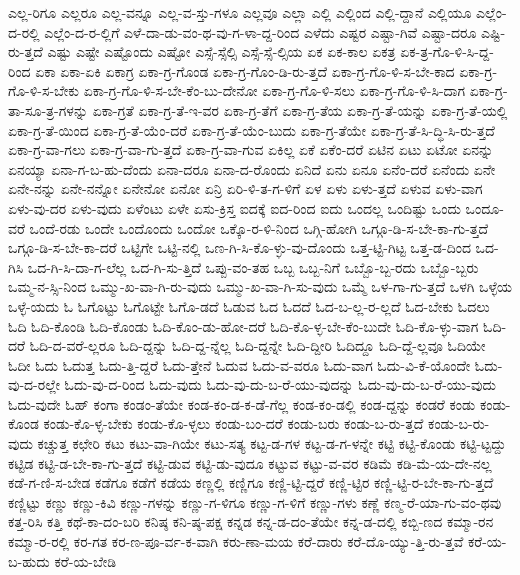 {ಎಲ್ಲ-ರಿಗೂ
ಎಲ್ಲರೂ
ಎಲ್ಲ-ವನ್ನೂ
ಎಲ್ಲ-ವ-ಸ್ತು-ಗಳೂ
ಎಲ್ಲವೂ
ಎಲ್ಲಾ
ಎಲ್ಲಿ
ಎಲ್ಲಿಂದ
ಎಲ್ಲಿ-ದ್ದಾನೆ
ಎಲ್ಲಿಯೂ
ಎಲ್ಲೆಂ-ದ-ರಲ್ಲಿ
ಎಲ್ಲೆಂ-ದ-ರ-ಲ್ಲಿಗೆ
ಎಳೆ-ದಾ-ಡು-ವಂ-ಥ-ವು-ಗ-ಳಾ-ದ್ದ-ರಿಂದ
ಎಳೆದು
ಎಷ್ಟರ
ಎಷ್ಟಾ-ಗಿವೆ
ಎಷ್ಟಾ-ದರೂ
ಎಷ್ಟಿ-ರು-ತ್ತದೆ
ಎಷ್ಟು
ಎಷ್ಟೇ
ಎಷ್ಟೊಂದು
ಎಷ್ಟೋ
ಎಸ್ಸೆ-ಸ್ಸೆಲ್ಸಿ
ಎಸ್ಸೆ-ಸ್ಸೆ-ಲ್ಸಿಯ
ಏಕ
ಏಕ-ಕಾಲ
ಏಕತ್ರ
ಏಕ-ತ್ರ-ಗೊ-ಳಿ-ಸಿ-ದ್ದ-ರಿಂದ
ಏಕಾ
ಏಕಾ-ಏಕಿ
ಏಕಾಗ್ರ
ಏಕಾ-ಗ್ರ-ಗೊಂಡ
ಏಕಾ-ಗ್ರ-ಗೊಂ-ಡಿ-ರು-ತ್ತದೆ
ಏಕಾ-ಗ್ರ-ಗೊ-ಳಿ-ಸ-ಬೇ-ಕಾದ
ಏಕಾ-ಗ್ರ-ಗೊ-ಳಿ-ಸ-ಬೇಕು
ಏಕಾ-ಗ್ರ-ಗೊ-ಳಿ-ಸ-ಬೇ-ಕೆಂ-ಬು-ದೇನೋ
ಏಕಾ-ಗ್ರ-ಗೊ-ಳಿ-ಸಲು
ಏಕಾ-ಗ್ರ-ಗೊ-ಳಿ-ಸಿ-ದಾಗ
ಏಕಾ-ಗ್ರ-ತಾ-ಸೂ-ತ್ರ-ಗಳನ್ನು
ಏಕಾ-ಗ್ರತೆ
ಏಕಾ-ಗ್ರ-ತೆ-ಇ-ವರ
ಏಕಾ-ಗ್ರ-ತೆಗೆ
ಏಕಾ-ಗ್ರ-ತೆಯ
ಏಕಾ-ಗ್ರ-ತೆ-ಯನ್ನು
ಏಕಾ-ಗ್ರ-ತೆ-ಯಲ್ಲಿ
ಏಕಾ-ಗ್ರ-ತೆ-ಯಿಂದ
ಏಕಾ-ಗ್ರ-ತೆ-ಯೆಂ-ದರೆ
ಏಕಾ-ಗ್ರ-ತೆ-ಯೆಂ-ಬುದು
ಏಕಾ-ಗ್ರ-ತೆಯೇ
ಏಕಾ-ಗ್ರ-ತೆ-ಸಿ-ದ್ಧಿ-ಸಿ-ರು-ತ್ತದೆ
ಏಕಾ-ಗ್ರ-ವಾ-ಗಲು
ಏಕಾ-ಗ್ರ-ವಾ-ಗು-ತ್ತದೆ
ಏಕಾ-ಗ್ರ-ವಾ-ಗುವ
ಏಕಿಲ್ಲ
ಏಕೆ
ಏಕೆಂ-ದರೆ
ಏಟಿನ
ಏಟು
ಏಟೋ
ಏನನ್ನು
ಏನಯ್ಯಾ
ಏನಾ-ಗ-ಬ-ಹು-ದೆಂದು
ಏನಾ-ದರೂ
ಏನಾ-ದ-ರೊಂದು
ಏನಿದೆ
ಏನು
ಏನೂ
ಏನೆಂ-ದರೆ
ಏನೆಂದು
ಏನೇ
ಏನೇ-ನನ್ನು
ಏನೇ-ನನ್ನೋ
ಏನೇನೋ
ಏನೋ
ಏನ್ರಿ
ಏರಿ-ಳಿ-ತ-ಗ-ಳಿಗೆ
ಏಳ
ಏಳು
ಏಳು-ತ್ತದೆ
ಏಳುವ
ಏಳು-ವಾಗ
ಏಳು-ವು-ದರ
ಏಳು-ವುದು
ಏಳೆಂಟು
ಏಳೇ
ಏಸು-ಕ್ರಿಸ್ತ
ಐದಕ್ಕೆ
ಐದ-ರಿಂದ
ಐದು
ಒಂದಲ್ಲ
ಒಂದಿಷ್ಟು
ಒಂದು
ಒಂದೂ-ವರೆ
ಒಂದೆ-ರಡು
ಒಂದೇ
ಒಂದೊಂದು
ಒಂದೋ
ಒಕ್ಕೊ-ರ-ಳಿ-ನಿಂದ
ಒಗ್ಗಿ-ಹೋಗಿ
ಒಗ್ಗೂ-ಡಿ-ಸ-ಬೇ-ಕಾ-ಗು-ತ್ತದೆ
ಒಗ್ಗೂ-ಡಿ-ಸ-ಬೇ-ಕಾ-ದರೆ
ಒಟ್ಟಿಗೇ
ಒಟ್ಟಿ-ನಲ್ಲಿ
ಒಣ-ಗಿ-ಸಿ-ಕೊ-ಳ್ಳು-ವು-ದೊಂದು
ಒತ್ತ-ಟ್ಟಿ-ಗಿಟ್ಟ
ಒತ್ತ-ಡ-ದಿಂದ
ಒದ-ಗಿಸಿ
ಒದ-ಗಿ-ಸಿ-ದಾ-ಗ-ಲೆಲ್ಲ
ಒದ-ಗಿ-ಸು-ತ್ತಿದೆ
ಒಪ್ಪು-ವಂ-ತಹ
ಒಬ್ಬ
ಒಬ್ಬ-ನಿಗೆ
ಒಬ್ಬೊ-ಬ್ಬ-ರದು
ಒಬ್ಬೊ-ಬ್ಬರು
ಒಮ್ಮ-ನ-ಸ್ಸಿ-ನಿಂದ
ಒಮ್ಮು-ಖ-ವಾ-ಗಿ-ರು-ವುದು
ಒಮ್ಮು-ಖ-ವಾ-ಗಿ-ಸು-ವುದು
ಒಮ್ಮೆ
ಒಳ-ಗಾ-ಗು-ತ್ತದೆ
ಒಳಗಿ
ಒಳ್ಳೆಯ
ಒಳ್ಳೆ-ಯದು
ಓ
ಓಗೊಟ್ಟು
ಓಗೊಟ್ಟೇ
ಓಗೊ-ಡದೆ
ಓಡುವ
ಓದ
ಓದದೆ
ಓದ-ಬ-ಲ್ಲ-ರ-ಲ್ಲದೆ
ಓದ-ಬೇಕು
ಓದಲು
ಓದಿ
ಓದಿ-ಕೊಂಡಿ
ಓದಿ-ಕೊಂಡು
ಓದಿ-ಕೊಂ-ಡು-ಹೋ-ದರೆ
ಓದಿ-ಕೊ-ಳ್ಳ-ಬೇ-ಕೆಂ-ಬುದೇ
ಓದಿ-ಕೊ-ಳ್ಳು-ವಾಗ
ಓದಿ-ದರೆ
ಓದಿ-ದ-ವರೆ-ಲ್ಲರೂ
ಓದಿ-ದ್ದನ್ನು
ಓದಿ-ದ್ದ-ನ್ನೆಲ್ಲ
ಓದಿ-ದ್ದನ್ನೇ
ಓದಿ-ದ್ದೀರಿ
ಓದಿದ್ದೂ
ಓದಿ-ದ್ದೆ-ಲ್ಲವೂ
ಓದಿಯೇ
ಓದೀ
ಓದು
ಓದುತ್ತ
ಓದು-ತ್ತಿ-ದ್ದರೆ
ಓದು-ತ್ತೇನೆ
ಓದುವ
ಓದು-ವ-ವರೂ
ಓದು-ವಾಗ
ಓದು-ವಿ-ಕೆ-ಯೊಂದೇ
ಓದು-ವು-ದ-ರಲ್ಲೇ
ಓದು-ವು-ದ-ರಿಂದ
ಓದು-ವುದು
ಓದು-ವು-ದು-ಬ-ರೆ-ಯು-ವುದನ್ನು
ಓದು-ವು-ದು-ಬ-ರೆ-ಯು-ವುದು
ಓದು-ವುದೇ
ಓಹ್
ಕಂಗಾ
ಕಂಡಂ-ತೆಯೇ
ಕಂಡ-ಕಂ-ಡ-ಕ-ಡೆ-ಗೆಲ್ಲ
ಕಂಡ-ಕಂ-ಡಲ್ಲಿ
ಕಂಡ-ದ್ದನ್ನು
ಕಂಡರೆ
ಕಂಡು
ಕಂಡು-ಕೊಂಡ
ಕಂಡು-ಕೊ-ಳ್ಳ-ಬೇಕು
ಕಂಡು-ಕೊ-ಳ್ಳಲು
ಕಂಡು-ಬಂ-ದರೆ
ಕಂಡು-ಬರು
ಕಂಡು-ಬ-ರು-ತ್ತದೆ
ಕಂಡು-ಬ-ರು-ವುದು
ಕಚ್ಚುತ್ತ
ಕಛೇರಿ
ಕಟು
ಕಟು-ವಾ-ಗಿಯೇ
ಕಟು-ಸತ್ಯ
ಕಟ್ಟ-ಡ-ಗಳ
ಕಟ್ಟ-ಡ-ಗ-ಳನ್ನೇ
ಕಟ್ಟಿ
ಕಟ್ಟಿ-ಕೊಂಡು
ಕಟ್ಟಿ-ಟ್ಟದ್ದು
ಕಟ್ಟಿಡ
ಕಟ್ಟಿ-ಡ-ಬೇ-ಕಾ-ಗು-ತ್ತದೆ
ಕಟ್ಟಿ-ಡುವ
ಕಟ್ಟಿ-ಡು-ವುದೂ
ಕಟ್ಟುವ
ಕಟ್ಟು-ವ-ವರ
ಕಡಿಮೆ
ಕಡಿ-ಮೆ-ಯ-ದೇ-ನಲ್ಲ
ಕಡೆ-ಗ-ಣಿ-ಸ-ಬೇಡ
ಕಡೆಗೂ
ಕಡೆಗೆ
ಕಡೆಯ
ಕಣ್ಣಲ್ಲಿ
ಕಣ್ಣಿಗೂ
ಕಣ್ಣಿ-ಟ್ಟಿ-ದ್ದರೆ
ಕಣ್ಣಿ-ಟ್ಟಿರ
ಕಣ್ಣಿ-ಟ್ಟಿ-ರ-ಬೇ-ಕಾ-ಗು-ತ್ತದೆ
ಕಣ್ಣಿಟ್ಟು
ಕಣ್ಣು
ಕಣ್ಣು-ಕಿವಿ
ಕಣ್ಣು-ಗಳನ್ನು
ಕಣ್ಣು-ಗ-ಳಿಗೂ
ಕಣ್ಣು-ಗ-ಳಿಗೆ
ಕಣ್ಣು-ಗಳು
ಕಣ್ಣೆ
ಕಣ್ಮ-ರೆ-ಯಾ-ಗು-ವಂ-ಥವು
ಕತ್ತ-ರಿಸಿ
ಕತ್ತಿ
ಕಥೆ-ಕಾ-ದಂ-ಬರಿ
ಕನಿಷ್ಠ
ಕನಿ-ಷ್ಠ-ಪಕ್ಷ
ಕನ್ನಡ
ಕನ್ನ-ಡ-ದಂ-ತೆಯೇ
ಕನ್ನ-ಡ-ದಲ್ಲಿ
ಕಬ್ಬಿ-ಣದ
ಕಮ್ಮಾ-ರನ
ಕಮ್ಮಾ-ರ-ರಲ್ಲಿ
ಕರ-ಗತ
ಕರ-ಣ-ಪೂ-ರ್ವ-ಕ-ವಾಗಿ
ಕರು-ಣಾ-ಮಯ
ಕರೆ-ದಾರು
ಕರೆ-ದೊ-ಯ್ಯು-ತ್ತಿ-ರು-ತ್ತವೆ
ಕರೆ-ಯ-ಬ-ಹುದು
ಕರೆ-ಯ-ಬೇಡಿ
}
